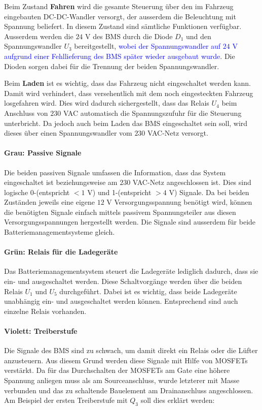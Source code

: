 Beim Zustand \textbf{Fahren} wird die gesamte Steuerung über den im Fahrzeug eingebauten DC-DC-Wandler versorgt, der ausserdem die Beleuchtung mit Spannung beliefert. In diesem Zustand sind sämtliche Funktionen verfügbar. Ausserdem werden die $24$ V des BMS durch die Diode $D_1$ und den Spannungswandler $U_3$ bereitgestellt, \textcolor{blue}{wobei der Spannungswandler auf $24$ V aufgrund einer Fehllieferung des BMS später wieder ausgebaut wurde}. Die Dioden sorgen dabei für die Trennung der beiden Spannungswandler.

Beim \textbf{Laden} ist es wichtig, dass das Fahrzeug nicht eingeschaltet werden kann. Damit wird verhindert, dass versehentlich mit dem noch eingesteckten Fahrzeug losgefahren wird. Dies wird dadurch sichergestellt, dass das Relais $U_4$ beim Anschluss von $230$ VAC automatisch die Spannungszufuhr für die Steuerung unterbricht. Da jedoch auch beim Laden das BMS eingeschaltet sein soll, wird dieses über einen Spannungswandler vom $230$ VAC-Netz versorgt.

\paragraph{Grau: Passive Signale}
Die beiden passiven Signale umfassen die Information, dass das System eingeschaltet ist beziehungsweise am $230$ VAC-Netz angeschlossen ist. Dies sind logische 0-(entspricht $<1$ V) und 1-(entspricht $>4$ V) Signale. Da bei beiden Zuständen jeweils eine eigene $12$ V Versorgungsspannung benötigt wird, können die benötigten Signale einfach mittels passivem Spannungsteiler aus diesen Versorgungsspannungen hergestellt werden. Die Signale sind ausserdem für beide Batteriemanagementsysteme gleich.

\paragraph{Grün: Relais für die Ladegeräte}
Das Batteriemanagementsystem steuert die Ladegeräte lediglich dadurch, dass sie ein- und ausgeschaltet werden. Diese Schaltvorgänge werden über die beiden Relais $U_1$ und $U_5$ durchgeführt. Dabei ist es wichtig, dass beide Ladegeräte unabhängig ein- und ausgeschaltet werden können. Entsprechend sind auch einzelne Relais vorhanden.

\paragraph{Violett: Treiberstufe}
Die Signale des BMS sind zu schwach, um damit direkt ein Relais oder die Lüfter anzusteuern. Aus diesem Grund werden diese Signale mit Hilfe von MOSFETs verstärkt. Da für das Durchschalten der MOSFETs am Gate eine höhere Spannung anliegen muss als am Sourceanschluss, wurde letzterer mit Masse verbunden und das zu schaltende Bauelement am Drainanschluss angeschlossen. Am Beispiel der ersten Treiberstufe mit $Q_3$ soll dies erklärt werden:

